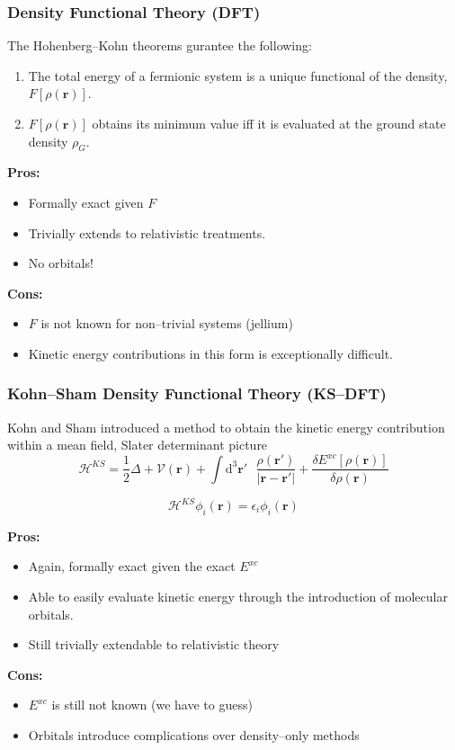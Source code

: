 \documentclass{beamer}
\begin{document}
\begin{frame}
\frametitle{Density Functional Theory (DFT)}

The Hohenberg--Kohn theorems gurantee the following:
\begin{enumerate}
  \item The total energy of a fermionic system is a unique functional of the density, $F[\rho(\mathbf{r})]$.
  \item $F[\rho(\mathbf{r})]$ obtains its minimum value iff it is evaluated at the ground state density $\rho_G$.
\end{enumerate}

\textbf{Pros:}
\begin{itemize}
  \item Formally exact given $F$
  \item Trivially extends to relativistic treatments.
  \item No orbitals!
\end{itemize}

\textbf{Cons:}
\begin{itemize}
  \item $F$ is not known for non--trivial systems (jellium)
  \item Kinetic energy contributions in this form is exceptionally difficult.
\end{itemize}

\end{frame}

\begin{frame}
\frametitle{Kohn--Sham Density Functional Theory (KS--DFT)}

Kohn and Sham introduced a method to obtain the kinetic energy contribution
within a mean field, Slater determinant picture
\begin{equation*}
\mathcal{H}^{KS} = \frac{1}{2}\Delta + \mathcal{V}(\mathbf{r}) + 
  \int \mathrm{d}^3\mathbf{r}'\text{ } \frac{\rho(\mathbf{r}')}{\vert \mathbf{r-r}' \vert} +
  \frac{\delta E^{xc}[\rho(\mathbf{r})]}{\delta \rho(\mathbf{r})}
\end{equation*}

\begin{equation*}
\mathcal{H}^{KS} \phi_i(\mathbf{r}) = \epsilon_i\phi_i(\mathbf{r})
\end{equation*}


\textbf{Pros:}
\begin{itemize}
  \item Again, formally exact given the exact $E^{xc}$
  \item Able to easily evaluate kinetic energy through the introduction
  of molecular orbitals.
  \item Still trivially extendable to relativistic theory
\end{itemize}

\textbf{Cons:}
\begin{itemize}
  \item $E^{xc}$ is still not known (we have to guess)
  \item Orbitals introduce complications over density--only methods
\end{itemize}
\end{frame}
\end{document}
